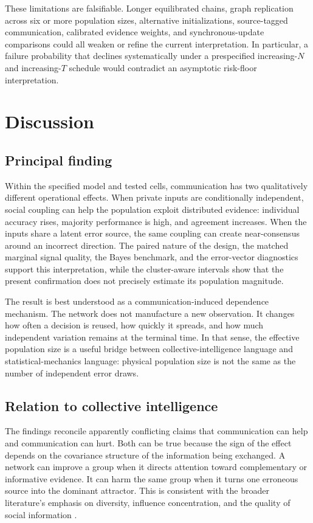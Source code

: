 \documentclass[11pt,a4paper]{article}
\begin{document}
These limitations are falsifiable. Longer equilibrated chains, graph replication across six or more population sizes, alternative initializations, source-tagged communication, calibrated evidence weights, and synchronous-update comparisons could all weaken or refine the current interpretation. In particular, a failure probability that declines systematically under a prespecified increasing-$N$ and increasing-$T$ schedule would contradict an asymptotic risk-floor interpretation.

\section{Discussion}

\subsection{Principal finding}

Within the specified model and tested cells, communication has two qualitatively different operational effects. When private inputs are conditionally independent, social coupling can help the population exploit distributed evidence: individual accuracy rises, majority performance is high, and agreement increases. When the inputs share a latent error source, the same coupling can create near-consensus around an incorrect direction. The paired nature of the design, the matched marginal signal quality, the Bayes benchmark, and the error-vector diagnostics support this interpretation, while the cluster-aware intervals show that the present confirmation does not precisely estimate its population magnitude.

The result is best understood as a communication-induced dependence mechanism. The network does not manufacture a new observation. It changes how often a decision is reused, how quickly it spreads, and how much independent variation remains at the terminal time. In that sense, the effective population size is a useful bridge between collective-intelligence language and statistical-mechanics language: physical population size is not the same as the number of independent error draws.

\subsection{Relation to collective intelligence}

The findings reconcile apparently conflicting claims that communication can help and communication can hurt. Both can be true because the sign of the effect depends on the covariance structure of the information being exchanged. A network can improve a group when it directs attention toward complementary or informative evidence. It can harm the same group when it turns one erroneous source into the dominant attractor. This is consistent with the broader literature's emphasis on diversity, influence concentration, and the quality of social information \citep{lorenz2011,golub_jackson2010,becker2017,jayles2017}.
\end{document}
